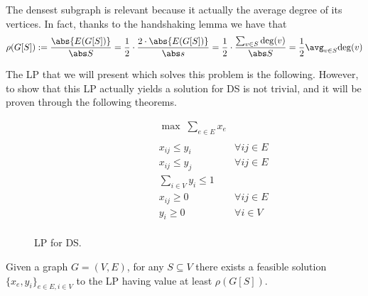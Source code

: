\documentclass[a4paper, 12pt]{report}
\begin{document}
    The densest subgraph is relevant because it actually  the average degree of its vertices. In fact, thanks to the handshaking lemma we have that $$\rho(G[S]) := \dfrac{\abs{E(G[S])}}{\abs S} = \dfrac{1}{2} \cdot \dfrac{2 \cdot \abs{E(G[S])}}{\abs s} = \dfrac{1}{2} \cdot \dfrac{\sum_{v \in S}{\deg (v)}}{\abs S} = \dfrac{1}{2} \avg_{v \in S}{\deg(v)}$$

    The LP that we will present which solves this problem is the following. However, to show that this LP actually yields a solution for DS is not trivial, and it will be proven through the following theorems.

    \begin{figure}[H]
        \centering
        \[\begin{array}{ccl}
            \qquad\qquad\quad
            & \max \; \displaystyle \sum_{e \in E} {x_e} \\\\
            & x_{ij} \le y_i & \forall i j \in E \\
            & x_{ij} \le y_j & \forall i j \in E \\
            & \sum\limits_{i \in V}{y_i} \le 1 \\
            & x_{ij} \ge 0 & \forall i j \in E \\
            & y_i \ge 0 & \forall i \in V \\
        \end{array}\]
        \caption{LP for DS.}
        \label{ds lp}
    \end{figure}

    \begin{framedlem}{}
        Given a graph $G = (V, E)$, for any $S \subseteq V$ there exists a feasible solution $\{x_e, y_i\}_{e \in E, i \in V}$ to the LP having value at least $\rho(G[S])$.
    \end{framedlem}
\end{document}
